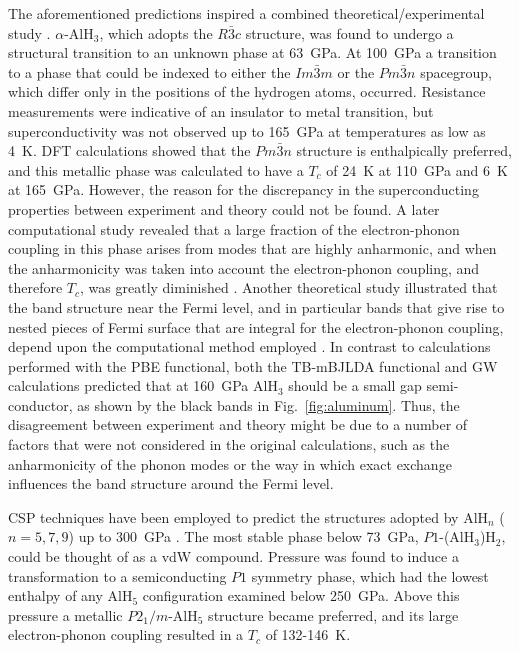 \documentclass[12pt,letterpaper,oneside]{article}
\begin{document}
The aforementioned predictions inspired a combined theoretical/experimental study \cite{Goncharenko:2008-Al}. $\alpha$-AlH$_3$, which adopts the $R\bar{3}c$ structure, was found to undergo a structural transition to an unknown phase at 63~GPa. At 100~GPa a transition to a phase that could be indexed to either the $Im\bar{3}m$ or the $Pm\bar{3}n$ spacegroup, which differ only in the positions of the hydrogen atoms, occurred. Resistance measurements were indicative of an insulator to metal transition, but superconductivity was not observed up to 165~GPa at temperatures as low as 4~K. DFT calculations showed that the $Pm\bar{3}n$ structure is enthalpically preferred, and this metallic phase was calculated to have a $T_c$ of 24~K at 110~GPa and 6~K at 165~GPa. However, the reason for the discrepancy in the superconducting properties between experiment and theory could not be found. A later computational study revealed that a large fraction of the electron-phonon coupling in this phase arises from modes that are highly anharmonic, and when the anharmonicity was taken into account the electron-phonon coupling, and therefore $T_c$, was greatly diminished \cite{Rousseau:2010-Al,Rousseau:2011-Al}. Another theoretical study illustrated that the band structure near the Fermi level, and in particular bands that give rise to nested pieces of Fermi surface that are integral for the electron-phonon coupling, depend upon the computational method employed \cite{Shi:2012-Al}. In contrast to calculations performed with the PBE functional, both the TB-mBJLDA functional and GW calculations predicted that at 160~GPa AlH$_3$ should be a small gap semi-conductor, as shown by the black bands in Fig.\ \ref{fig:aluminum}. Thus, the disagreement between experiment and theory might be due to a number of factors that were not considered in the original calculations, such as the anharmonicity of the phonon modes or the way in which exact exchange influences the band structure around the Fermi level.


CSP techniques have been employed to predict the structures adopted by AlH$_n$ ($n=5,7,9$) up to 300~GPa \cite{Hou:2015-Al}. The most stable phase below 73~GPa, $P1$-(AlH$_3$)H$_2$, could be thought of as a vdW compound. Pressure was found to induce a transformation to a semiconducting $P1$ symmetry phase, which had the lowest enthalpy of any AlH$_5$ configuration examined below 250~GPa. Above this pressure a metallic $P2_1/m$-AlH$_5$ structure became preferred, and its large electron-phonon coupling resulted in a $T_c$ of 132-146~K. \\
\end{document}
